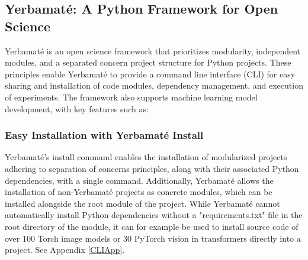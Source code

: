 


\subsection{Yerbamaté: A Python Framework for Open Science}

Yerbamaté is an open science framework that prioritizes modularity, independent modules, and a separated concern project structure for Python projects. These principles enable Yerbamaté to provide a command line interface (CLI) for easy sharing and installation of code modules, dependency management, and execution of experiments. The framework also supports machine learning model development, with key features such as:

\subsubsection{Easy Installation with Yerbamaté Install}

Yerbamaté's install command enables the installation of modularized projects adhering to separation of concerns principles, along with their associated Python dependencies, with a single command. Additionally, Yerbamaté allows the installation of non-Yerbamaté projects as concrete modules, which can be installed alongside the root module of the project. While Yerbamaté cannot automatically install Python dependencies without a "requirements.txt" file in the root directory of the module, it can for example be used to install source code of over 100 Torch image models or 30 PyTorch vision in transformers directly into a project. See Appendix \ref{CLIApp}.

